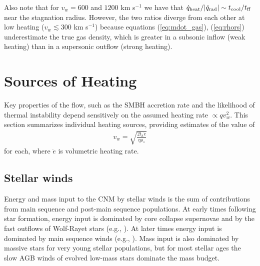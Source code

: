 \documentclass[usenatbib,fleqn]{mn2e}
\newcommand{\rhostar}{\rho_*}
\begin{document}
Also note that for $v_{w}=600$ and $1200$ km s$^{-1}$ we have that $\dot{q}_{\rm heat}/|\dot{q}_{\rm rad}| \sim t_{\rm cool}/t_{\rm ff}$ near the stagnation radius.  However, the two ratios diverge from each other at low heating ($v_{w} \lesssim 300$ km s$^{-1}$) because equations (\ref{eq:mdot_gas}), (\ref{eq:rhors}) underestimate the true gas density, which is greater in a subsonic inflow (weak heating) than in a supersonic outflow (strong heating).  

\section{Sources of Heating}
\label{sec:heating}

Key properties of the flow, such as the SMBH accretion rate and the likelihood of thermal instability depend sensitively on the assumed heating rate $\propto qv_{w}^{2}$.  This section summarizes individual heating sources, providing estimates of the value of
\begin{align}
  v_{w} = \sqrt{\frac{2 t_h \dot{e}}{\eta \rhostar}}
  \label{eq:vw_eff}
\end{align}
for each, where $\dot{e}$ is volumetric heating rate.  

\subsection{Stellar winds} 

Energy and mass input to the CNM by stellar winds is the sum of contributions from main sequence and post-main sequence populations.  At early times following star formation, energy input is dominated by core collapse supernovae and by the fast outflows of Wolf-Rayet stars (e.g., \citealt{VossDiehl+:2009a}).  At later times energy input is dominated by main sequence winds (e.g., \citealt{NaimanSoares-Furtado+:2013a}).  Mass input is also dominated by massive stars for very young stellar populations, but for most stellar ages the slow AGB winds of evolved low-mass stars dominate the mass budget.  
\end{document}
